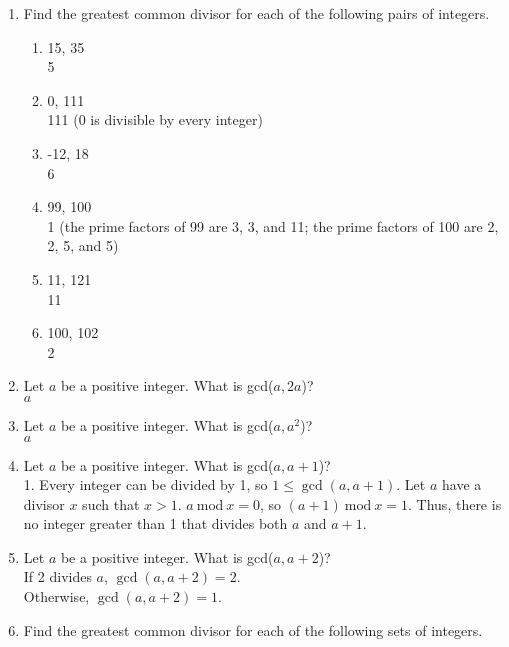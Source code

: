 \documentclass{article}
\begin{document}
\begin{enumerate}
      \item Find the greatest common divisor for each of the following pairs of integers.
            \begin{enumerate}
                  \item 15, 35\\
                        5
                  \item 0, 111\\
                        111 (0 is divisible by every integer)
                  \item -12, 18\\
                        6
                  \item 99, 100\\
                        1 (the prime factors of 99 are 3, 3, and 11; the prime factors of 100 are 2, 2, 5, and 5)
                  \item 11, 121\\
                        11
                  \item 100, 102\\
                        2
            \end{enumerate}
      \item Let $a$ be a positive integer. What is gcd($a, 2a$)?\\
            $a$
      \item Let $a$ be a positive integer. What is gcd($a, a^{2}$)?\\
            $a$
      \item Let $a$ be a positive integer. What is gcd($a, a + 1$)?\\
            1. %
            Every integer can be divided by 1, so $1 \leq \gcd(a, a+1)$. Let $a$ have a divisor $x$ such that $x > 1$. $a\ \text{mod}\ x = 0$, so $(a+1)\ \text{mod}\ x = 1$. Thus, there is no integer greater than 1 that divides both $a$ and $a+1$.
      \item Let $a$ be a positive integer. What is gcd($a, a + 2$)?\\
            If 2 divides $a$, $\gcd(a, a+2) = 2$.\\
            Otherwise, $\gcd(a, a+2) = 1$.
      \item Find the greatest common divisor for each of the following sets of integers.
            \begin{enumerate}

\end{enumerate}
\end{enumerate}
\end{document}

